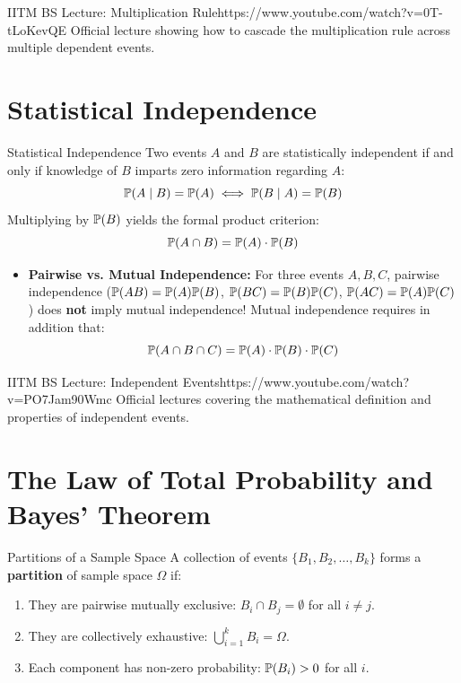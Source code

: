 \begin{videocard}{IITM BS Lecture: Multiplication Rule}{https://www.youtube.com/watch?v=0T-tLoKevQE}
Official lecture showing how to cascade the multiplication rule across multiple dependent events.
\end{videocard}

\section{Statistical Independence}

\begin{definitionbox}{Statistical Independence}
Two events $A$ and $B$ are statistically independent if and only if knowledge of $B$ imparts zero information regarding $A$:
$$\P(A \mid B) = \P(A) \iff \P(B \mid A) = \P(B)$$
Multiplying by $\P(B)$ yields the formal product criterion:
$$\P(A \cap B) = \P(A) \cdot \P(B)$$
\begin{itemize}
    \item \textbf{Pairwise vs. Mutual Independence:} For three events $A, B, C$, pairwise independence ($\P(AB) = \P(A)\P(B)$, $\P(BC) = \P(B)\P(C)$, $\P(AC) = \P(A)\P(C)$) does \textbf{not} imply mutual independence! Mutual independence requires in addition that:
    $$\P(A \cap B \cap C) = \P(A) \cdot \P(B) \cdot \P(C)$$
\end{itemize}
\end{definitionbox}

\begin{videocard}{IITM BS Lecture: Independent Events}{https://www.youtube.com/watch?v=PO7Jam90Wmc}
Official lectures covering the mathematical definition and properties of independent events.
\end{videocard}

\section{The Law of Total Probability and Bayes' Theorem}

\begin{definitionbox}{Partitions of a Sample Space}
A collection of events $\{B_1, B_2, \dots, B_k\}$ forms a \textbf{partition} of sample space $\Omega$ if:
\begin{enumerate}
    \item They are pairwise mutually exclusive: $B_i \cap B_j = \emptyset$ for all $i \neq j$.
    \item They are collectively exhaustive: $\bigcup_{i=1}^k B_i = \Omega$.
    \item Each component has non-zero probability: $\P(B_i) > 0$ for all $i$.
\end{enumerate}
\end{definitionbox}

